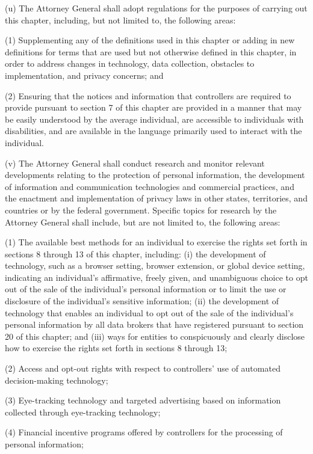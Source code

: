 (u) The Attorney General shall adopt regulations for the purposes of carrying out this chapter, including, but not limited to, the following areas:

(1) Supplementing any of the definitions used in this chapter or adding in new definitions for terms that are used but not otherwise defined in this chapter, in order to address changes in technology, data collection, obstacles to implementation, and privacy concerns; and

(2) Ensuring that the notices and information that controllers are required to provide pursuant to section 7 of this chapter are provided in a manner that may be easily understood by the average individual, are accessible to individuals with disabilities, and are available in the language primarily used to interact with the individual.

(v) The Attorney General shall conduct research and monitor relevant developments relating to the protection of personal information, the development of information and communication technologies and commercial practices, and the enactment and implementation of privacy laws in other states, territories, and countries or by the federal government. Specific topics for research by the Attorney General shall include, but are not limited to, the following areas:

(1) The available best methods for an individual to exercise the rights set forth in sections 8 through 13 of this chapter, including: (i) the development of technology, such as a browser setting, browser extension, or global device setting, indicating an individual’s affirmative, freely given, and unambiguous choice to opt out of the sale of the individual’s personal information or to limit the use or disclosure of the individual’s sensitive information; (ii) the development of technology that enables an individual to opt out of the sale of the individual’s personal information by all data brokers that have registered pursuant to section 20 of this chapter; and (iii) ways for entities to conspicuously and clearly disclose how to exercise the rights set forth in sections 8 through 13;

(2) Access and opt-out rights with respect to controllers’ use of automated decision-making technology;

(3) Eye-tracking technology and targeted advertising based on information collected through eye-tracking technology;

(4) Financial incentive programs offered by controllers for the processing of personal information;

